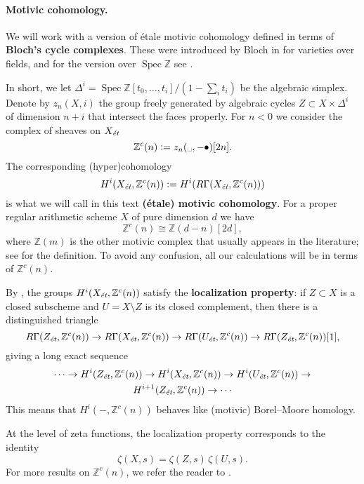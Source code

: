 \documentclass[draft]{article}
\DeclareMathOperator{\Spec}{Spec}
\newcommand{\ZZ}{\mathbb{Z}}
\newcommand{\et}{\text{\it \'{e}t}}
\newcommand{\dfn}{\mathrel{\mathop:}=}
\theoremstyle{myplain}
\theoremstyle{mydefinition}
\begin{document}
\paragraph{Motivic cohomology.}
We will work with a version of \'{e}tale motivic cohomology defined in terms of
\textbf{Bloch's cycle complexes}. These were introduced by Bloch in
\cite{Bloch-1986} for varieties over fields, and for the version over
$\Spec \ZZ$ see \cite{Geisser-2004-Dedekind,Geisser-2005}.

In short, we let $\Delta^i = \Spec \ZZ [t_0,\ldots,t_i] / (1 - \sum_i t_i)$ be
the algebraic simplex. Denote by $z_n (X, i)$ the group freely generated by
algebraic cycles $Z \subset X \times \Delta^i$ of dimension $n+i$ that intersect
the faces properly. For $n < 0$ we consider the complex of sheaves on $X_\et$
$$\ZZ^c (n) \dfn z_n (\text{\textvisiblespace}, -\bullet) [2n].$$
The corresponding (hyper)cohomology
$$H^i (X_\et, \ZZ^c (n)) \dfn H^i (R\Gamma (X_\et, \ZZ^c (n)))$$
is what we will call in this text \textbf{(\'{e}tale) motivic cohomology}.
For a proper regular arithmetic scheme $X$ of pure dimension $d$ we have
\begin{equation}
  \label{eqn:Zc(n)-vs-Z(d-n)}
  \ZZ^c (n) \cong \ZZ (d-n) [2d],
\end{equation}
where $\ZZ (m)$ is the other motivic complex that usually appears in the
literature; see \cite{Geisser-2004-Dedekind,Geisser-2005} for the definition.
To avoid any confusion, all our calculations will be in terms of $\ZZ^c (n)$.

By \cite[Corollary~7.2]{Geisser-2010}, the groups $H^i (X_\et, \ZZ^c (n))$
satisfy the \textbf{localization property}: if $Z \subset X$ is a closed
subscheme and $U = X\setminus Z$ is its closed complement, then there is a
distinguished triangle
\[ R\Gamma (Z_\et, \ZZ^c (n)) \to
  R\Gamma (X_\et, \ZZ^c (n)) \to
  R\Gamma (U_\et, \ZZ^c (n)) \to 
  R\Gamma (Z_\et, \ZZ^c (n)) [1], \]
giving a long exact sequence
\begin{multline}
  \label{eqn:localization-les}
  \cdots \to H^i (Z_\et, \ZZ^c (n)) \to
  H^i (X_\et, \ZZ^c (n)) \to
  H^i (U_\et, \ZZ^c (n)) \to \\
  H^{i+1} (Z_\et, \ZZ^c (n)) \to \cdots
\end{multline}
This means that $H^i (-, \ZZ^c (n))$ behaves like (motivic) Borel--Moore
homology.

At the level of zeta functions, the localization property corresponds to the
identity
$$\zeta (X,s) = \zeta (Z,s)\,\zeta (U,s).$$
For more results on $\ZZ^c (n)$, we refer the reader to \cite{Geisser-2010}.
 
\end{document}
